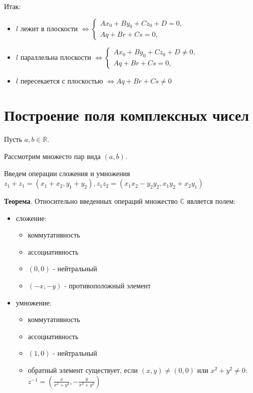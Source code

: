 \documentclass[a4paper]{article}
\begin{document}
Итак: \begin{itemize}
\item $l$ лежит в плоскости $\Leftrightarrow \begin{cases}
Ax_0 + By_0 + Cz_0 + D = 0,
\\
Aq+Br+Cs=0,
\end{cases}$
\item $l$ параллельна плоскости $\Leftrightarrow \begin{cases}
Ax_0 + By_0 + Cz_0 + D \neq 0,
\\
Aq+Br+Cs=0,
\end{cases}$
\item $l$ пересекается с плоскостью $\Leftrightarrow Aq+Br+Cs\neq 0$
\end{itemize}



\section*{Построение поля комплексных чисел}
Пусть $a,b \in \mathbb{R}$.

Рассмотрим множесто пар вида $(a,b)$.

Введем операции сложения и умножения $z_1 + z_1 = (x_1+x_2,y_1+y_2), z_1 z_2 = (x_1 x_2 -y_2 y_2, x_1 y_2 + x_2 y_1)$

\textbf{Теорема}. Относительно введенных операций множество $\mathbb{C}$ является полем:
\begin{itemize}
\item 
	сложение:\begin{itemize}
	\item коммутативность
	\item ассоциативность
	\item $(0,0)$ - нейтральный
	\item $(-x,-y)$ - противоположный элемент
	\end{itemize}

\item 
	умножение: \begin{itemize}
	\item коммутативность
	\item ассоциативность
	\item $(1,0)$ - нейтральный
	\item обратный элемент существует, если $(x,y) \neq (0,0)$ или $\displaystyle x^2+y^2 \neq 0$: $z^{-1} = \left( \frac{x}{x^2+y^2},-\frac{y}{x^2+y^2} \right)$
		\end{itemize}
		
		
\end{itemize}
\end{document}
